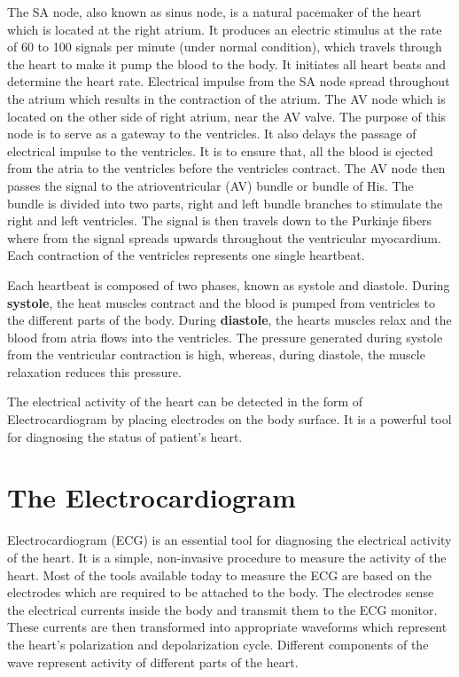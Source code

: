 The SA node, also known as sinus node, is a natural pacemaker of the heart which is located at the right atrium. It produces an electric stimulus at the rate of 60 to 100 signals per minute (under normal condition), which travels through the heart to make it pump the blood to the body. It initiates all heart beats and determine the heart rate. Electrical impulse from the SA node spread throughout the atrium which results in the contraction of the atrium. The AV node which is located on the other side of right atrium, near the AV valve. The purpose of this node is to serve as a gateway to the ventricles. It also delays the passage of electrical impulse to the ventricles. It is to ensure that, all the blood is ejected from the atria to the ventricles before the ventricles contract. The AV node then passes the signal to the atrioventricular (AV) bundle or bundle of His. The bundle is divided into two parts, right and left bundle branches to stimulate the right and left ventricles. The signal is then travels down to the Purkinje fibers where from the signal spreads upwards throughout the ventricular myocardium. Each contraction of the ventricles represents one single heartbeat.

Each heartbeat is composed of two phases, known as systole and diastole. During \textbf{systole}, the heat muscles contract and the blood is pumped from ventricles to the different parts of the body. During \textbf{diastole}, the hearts muscles relax and the blood from atria flows into the ventricles. The pressure generated during systole from the ventricular contraction is high, whereas, during diastole, the muscle relaxation reduces this pressure.

The electrical activity of the heart can be detected in the form of Electrocardiogram by placing electrodes on the body surface. It is a powerful tool for diagnosing the status of patient's heart.



\section{The Electrocardiogram} \label{the_electrocardiogram}

Electrocardiogram (ECG) is an essential tool for diagnosing the electrical activity of the heart. It is a simple, non-invasive procedure to measure the activity of the heart. Most of the tools available today to measure the ECG are based on the electrodes which are required to be attached to the body. The electrodes sense the electrical currents inside the body and transmit them to the ECG monitor. These currents are then transformed into appropriate waveforms which represent the heart's polarization and depolarization cycle. Different components of the wave represent activity of different parts of the heart.


